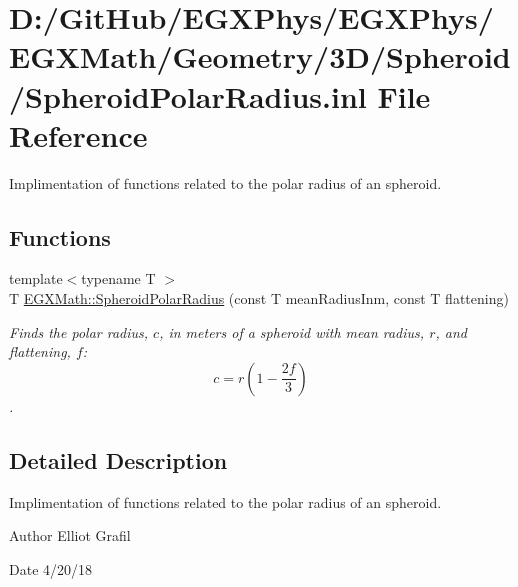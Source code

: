 \hypertarget{_spheroid_polar_radius_8inl}{}\section{D\+:/\+Git\+Hub/\+E\+G\+X\+Phys/\+E\+G\+X\+Phys/\+E\+G\+X\+Math/\+Geometry/3\+D/\+Spheroid/\+Spheroid\+Polar\+Radius.inl File Reference}
\label{_spheroid_polar_radius_8inl}


Implimentation of functions related to the polar radius of an spheroid.  


\subsection*{Functions}
\begin{DoxyCompactItemize}
\item 
{\footnotesize template$<$typename T $>$ }\\T \mbox{\hyperlink{group___e_g_x_math-_geometry-3_d-_spheroid-_polar_radius_gad4791a46a7efe39c63c03d2366fdd3d2}{E\+G\+X\+Math\+::\+Spheroid\+Polar\+Radius}} (const T mean\+Radius\+Inm, const T flattening)
\begin{DoxyCompactList}\small\item\em Finds the polar radius, $c$, in meters of a spheroid with mean radius, $r$, and flattening, $f$\+: \[ c = r \left (1 - \dfrac{2f}{3} \right ) \]. \end{DoxyCompactList}\end{DoxyCompactItemize}


\subsection{Detailed Description}
Implimentation of functions related to the polar radius of an spheroid. 

\begin{DoxyAuthor}{Author}
Elliot Grafil 
\end{DoxyAuthor}
\begin{DoxyDate}{Date}
4/20/18 
\end{DoxyDate}

